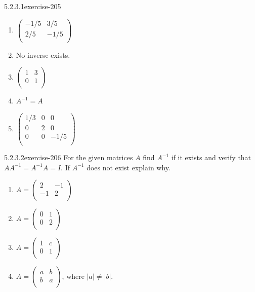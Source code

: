 \documentclass[twoside,10pt,]{book}
\numberwithin{equation}{section}
\begin{document}
\begin{divisionsolution}{5.2.3.1}{}{exercise-205}
\begin{multicols}{2}
\begin{enumerate}[label=(\alph*)]
\item\hypertarget{li-957}{}\(\left(
\begin{array}{cc}
-1/5 & 3/5 \\
2/5 & -1/5 \\
\end{array}
\right)\)%
\item\hypertarget{li-958}{}\hypertarget{p-1816}{}%
No inverse exists.%
\item\hypertarget{li-959}{}\(\left(
\begin{array}{cc}
1 & 3 \\
0 & 1 \\
\end{array}
\right)\)%
\item\hypertarget{li-960}{}\hypertarget{p-1817}{}%
\(A^{-1}=A\)%
\item\hypertarget{li-961}{}\hypertarget{p-1818}{}%
\(\left(
\begin{array}{ccc}
1/3 & 0 & 0 \\
0 & 2 & 0 \\
0 & 0 & -1/5 \\
\end{array}
\right)\)%
\end{enumerate}
\end{multicols}
%
\end{divisionsolution}%
\begin{divisionsolution}{5.2.3.2}{}{exercise-206}%
\hypertarget{p-1819}{}%
For the given matrices \(A\) find \(A^{-1}\) if it exists and verify that \(A A^{-1}=A^{-1}A = I\). If \(A^{-1}\) does not exist explain why.%
\par
\hypertarget{p-1820}{}%
\leavevmode%
\begin{enumerate}[label=(\alph*)]
\item\hypertarget{li-962}{}\(A =\left(
\begin{array}{cc}
2 & -1 \\
-1 & 2 \\
\end{array}
\right)\)%
\item\hypertarget{li-963}{}\(A = \left(
\begin{array}{cc}
0 & 1 \\
0 & 2 \\
\end{array}
\right)\)%
\item\hypertarget{li-964}{}\(A= \left(
\begin{array}{cc}
1 & c \\
0 & 1 \\
\end{array}
\right)\)%
\item\hypertarget{li-965}{}\(A = \left(
\begin{array}{cc}
a & b \\
b & a \\
\end{array}
\right)\), where \(\lvert a \rvert \neq \lvert b \rvert\).%
\end{enumerate}
%
\end{divisionsolution}%
\end{document}
